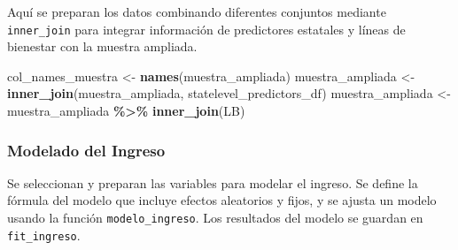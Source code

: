 \documentclass[
  12pt,
]{book}
\newenvironment{Shaded}{\begin{snugshade}}{\end{snugshade}}
\newcommand{\FunctionTok}[1]{\textcolor[rgb]{0.13,0.29,0.53}{\textbf{#1}}}
\newcommand{\NormalTok}[1]{#1}
\newcommand{\OtherTok}[1]{\textcolor[rgb]{0.56,0.35,0.01}{#1}}
\newcommand{\SpecialCharTok}[1]{\textcolor[rgb]{0.81,0.36,0.00}{\textbf{#1}}}
\begin{document}
Aquí se preparan los datos combinando diferentes conjuntos mediante \texttt{inner\_join} para integrar información de predictores estatales y líneas de bienestar con la muestra ampliada.

\begin{Shaded}
\begin{Highlighting}[]
\NormalTok{col\_names\_muestra }\OtherTok{\textless{}{-}} \FunctionTok{names}\NormalTok{(muestra\_ampliada)}
\NormalTok{muestra\_ampliada }\OtherTok{\textless{}{-}}  \FunctionTok{inner\_join}\NormalTok{(muestra\_ampliada, statelevel\_predictors\_df)}
\NormalTok{muestra\_ampliada }\OtherTok{\textless{}{-}}\NormalTok{ muestra\_ampliada }\SpecialCharTok{\%\textgreater{}\%} \FunctionTok{inner\_join}\NormalTok{(LB)}
\end{Highlighting}
\end{Shaded}

\hypertarget{modelado-del-ingreso}{%
\subsubsection*{Modelado del Ingreso}\label{modelado-del-ingreso}}

Se seleccionan y preparan las variables para modelar el ingreso. Se define la fórmula del modelo que incluye efectos aleatorios y fijos, y se ajusta un modelo usando la función \texttt{modelo\_ingreso}. Los resultados del modelo se guardan en \texttt{fit\_ingreso}.
\end{document}

